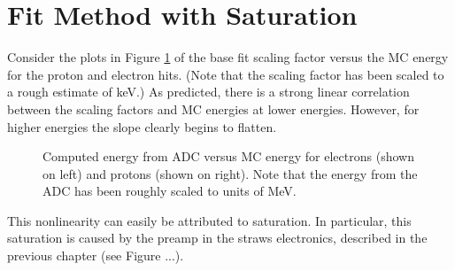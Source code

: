 


\section{Fit Method with Saturation \label{sec:sat}}

Consider the plots in Figure \ref{fig:scalingFactVsMCenergy} of the base fit scaling factor versus the MC energy for the proton and electron hits. (Note that the scaling factor has been scaled to a rough estimate of keV.) As predicted, there is a strong linear correlation between the scaling factors and MC energies at lower energies. However, for higher energies the slope clearly begins to flatten.

\begin{figure}[ht!]
    \centering
    \caption{Computed energy from ADC versus MC energy for electrons (shown on left) and protons (shown on right). Note that the energy from the ADC has been roughly scaled to units of MeV.}
    \label{fig:scalingFactVsMCenergy}
\end{figure} 

This nonlinearity can easily be attributed to saturation. In particular, this saturation is caused by the preamp in the straws electronics, described in the previous chapter (see Figure ...). 

